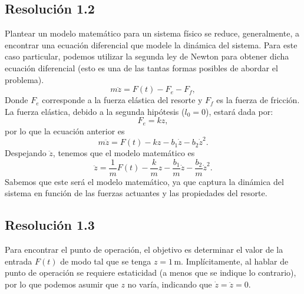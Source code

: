 \documentclass[
  11pt,
  letterpaper,
   addpoints,
   answers
  ]{exam}
\begin{document}
\begin{questions}
\begin{solution}
\subsection*{Resolución 1.2}
Plantear un modelo matemático para un sistema físico se reduce, generalmente, a encontrar una ecuación diferencial que modele la dinámica del sistema. Para este caso particular, podemos utilizar la segunda ley de Newton para obtener dicha ecuación diferencial (esto es una de las tantas formas posibles de abordar el problema).
\begin{equation}
    m\ddot{z} = F(t) - F_e - F_f, 
\end{equation}
Donde $F_e$ corresponde a la fuerza elástica del resorte y $F_f$ es la fuerza de fricción. La fuerza elástica, debido a la segunda hipótesis (\textit{$l_{0}=0$}), estará dada por:
\begin{equation}
    F_e = kz, 
\end{equation}
por lo que la ecuación anterior es
\begin{equation}
    m\ddot{z} = F(t) - kz - b_1\dot{z} - b_2\dot{z}^2. 
\end{equation}
Despejando $\ddot{z}$, tenemos que el modelo matemático es
\begin{equation}
    \ddot{z} = \frac{1}{m}F(t) - \frac{k}{m}z - \frac{b_1}{m}\dot{z} - \frac{b_2}{m}\dot{z}^2. 
\end{equation}
Sabemos que este será el modelo matemático, ya que captura la dinámica del sistema en función de las fuerzas actuantes y las propiedades del resorte. 
\subsection*{Resolución 1.3}
Para encontrar el punto de operación, el objetivo es determinar el valor de la entrada $F(t)$ de modo tal que se tenga $z = 1 \, \text{m}$. Implícitamente, al hablar de punto de operación se requiere estaticidad (a menos que se indique lo contrario), por lo que podemos asumir que $z$ no varía, indicando que $\dot{z} = \ddot{z} = 0$.


\end{solution}
\end{questions}
\end{document}
